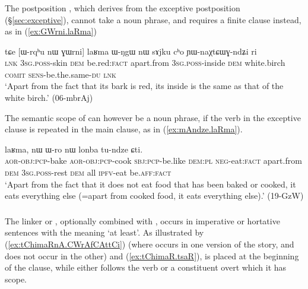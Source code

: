 \subsubsection{}
The postposition , which derives from the exceptive postposition  (§\ref{sec:exceptive}), cannot take a noun phrase, and requires a finite clause instead, as in (\ref{ex:GWrni.laRma})

\begin{exe}
\ex \label{ex:GWrni.laRma}
\gll tɕe [ɯ-rqʰu nɯ ɣɯrni] laʁma ɯ-ŋgɯ nɯ sɤjku cʰo ɲɯ-naχtɕɯɣ-ndʑi ri \\
\textsc{lnk} \textsc{3sg}.\textsc{poss}-skin \textsc{dem} be.red:\textsc{fact} apart.from \textsc{3sg}.\textsc{poss}-inside \textsc{dem} white.birch \textsc{comit} \textsc{sens}-be.the.same-\textsc{du} \textsc{lnk} \\
\glt `Apart from the fact that its bark is red, its inside is the same as that of the white birch.' (06-mbrAj)
\end{exe} 

The semantic scope of  can however be a noun phrase, if the verb in the exceptive clause is repeated in the main clause, as in (\ref{ex:mAndze.laRma}).

\begin{exe}
\ex \label{ex:mAndze.laRma}
 laʁma, nɯ ɯ-ro nɯ lonba tu-ndze ɕti. \\
\textsc{aor}-\textsc{obj}:\textsc{pcp}-bake \textsc{aor}-\textsc{obj}:\textsc{pcp}-cook  \textsc{sbj}:\textsc{pcp}-be.like \textsc{dem}:\textsc{pl} \textsc{neg}-eat:\textsc{fact} apart.from \textsc{dem} \textsc{3sg}.\textsc{poss}-rest \textsc{dem} all \textsc{ipfv}-eat be.\textsc{aff}:\textsc{fact} \\
\glt `Apart from the fact that it does not eat food that has been baked or cooked, it eats everything else (=apart from cooked food, it eats everything else).' (19-GzW)
\end{exe} 

\subsubsection{}
The linker  or , optionally combined with , occurs in imperative or hortative sentences with the meaning `at least'. As illustrated by (\ref{ex:tChimaRnA.CWrAfCAttCi}) (where  occurs in one version of the story, and does not occur in the other) and (\ref{ex:tChimaR.tsaR}),  is placed at the beginning of the clause, while  either follows the verb or a constituent overt which it has scope.

